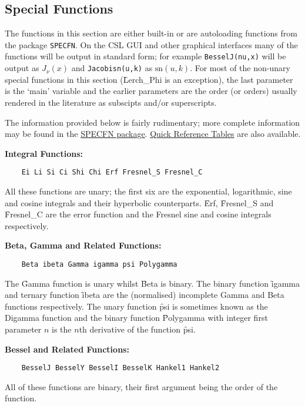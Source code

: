 \subsection{Special Functions}
The functions in this section are either built-in or are autoloading
functions from the package \texttt{SPECFN}. On the CSL GUI and other graphical
interfaces many of the functions will be output in standard form; for example
\texttt{BesselJ(nu,x)} will be output as $J_\nu(x)$ and \texttt{Jacobisn(u,k)}
as $\mathrm{sn}(u,k)$. For most of the non-unary special functions in this
section (\f{Lerch\_Phi} is an exception), the last parameter is the `main'
variable and the earlier parameters are the order (or orders)
usually rendered in the literature as subscipts and/or superscripts.

The information provided below is fairly rudimentary; more complete
information may be found in the \hyperlink{SPECFNS}{SPECFN package}.
\hyperlink{SPECFNTAB1}{Quick Reference Tables} are also available.

 
\textbf{Integral Functions:}
\begin{verbatim}
    Ei Li Si Ci Shi Chi Erf Fresnel_S Fresnel_C
\end{verbatim}
All these functions are unary;
the first six are the exponential, logarithmic, sine and
cosine integrals and their hyperbolic counterparts. \f{Erf},
\f{Fresnel\_S} and \f{Fresnel\_C} are the error function and the Fresnel
sine and cosine integrals respectively.

\textbf{Beta, Gamma and Related Functions:}
\begin{verbatim}
    Beta ibeta Gamma igamma psi Polygamma
\end{verbatim}
The \f{Gamma} function is unary whilst \f{Beta} is binary.
The binary function \f{igamma} and ternary function \f{ibeta}
are the (normalised) incomplete Gamma and Beta functions respectively.
The unary function \f{psi} is sometimes known as the Digamma function and
the binary function \f{Polygamma} with integer first parameter $n$ is the
$n$th derivative of the function \f{psi}.

\textbf{Bessel and Related Functions:}
\begin{verbatim}
    BesselJ BesselY BesselI BesselK Hankel1 Hankel2
\end{verbatim}
All of these functions are binary, their first argument being the
order of the function.

